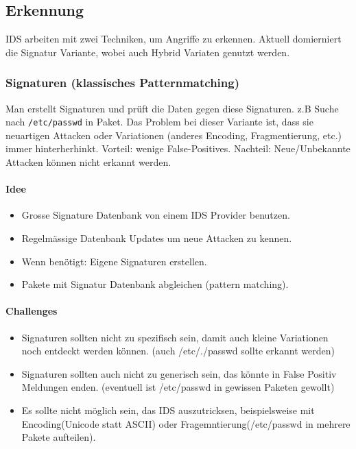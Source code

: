 \subsection{Erkennung}
IDS arbeiten mit zwei Techniken, um Angriffe zu erkennen. Aktuell domierniert die Signatur Variante, wobei auch Hybrid Variaten genutzt werden.

\subsubsection{Signaturen (klassisches Patternmatching)}
Man erstellt Signaturen und prüft die Daten gegen diese Signaturen. z.B Suche nach \lstinline|/etc/passwd| in Paket. Das Problem bei dieser Variante ist, dass sie neuartigen Attacken oder Variationen (anderes Encoding, Fragmentierung, etc.) immer hinterherhinkt. Vorteil: wenige False-Positives. Nachteil: Neue/Unbekannte Attacken können nicht erkannt werden.

\paragraph{Idee}
\begin{itemize}
    \item Grosse Signature Datenbank von einem IDS Provider benutzen. 
    \item Regelmässige Datenbank Updates um neue Attacken zu kennen.
    \item Wenn benötigt: Eigene Signaturen erstellen.
    \item Pakete mit Signatur Datenbank abgleichen (pattern matching).
\end{itemize}

\paragraph{Challenges}
\begin{itemize}
    \item Signaturen sollten nicht zu spezifisch sein, damit auch kleine Variationen noch entdeckt werden können. (auch /etc/./passwd sollte erkannt werden)
    \item Signaturen sollten auch nicht zu generisch sein, das könnte in False Positiv Meldungen enden. (eventuell ist /etc/passwd in gewissen Paketen gewollt)
    \item Es sollte nicht möglich sein, das IDS auszutricksen, beispielsweise mit Encoding(Unicode statt ASCII) oder Fragemntierung(/etc/passwd in mehrere Pakete aufteilen).
\end{itemize}

